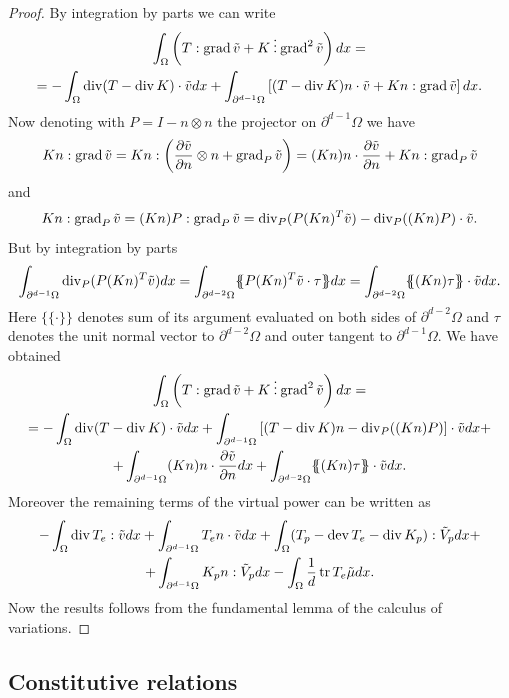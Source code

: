 \begin{proof}
By integration by parts we can write
\begin{multline*}
\int_\Omega\left(T:\operatorname{grad}\tilde v+K\mathbin{\vdots}\operatorname{grad}^2\tilde v\right)dx=\\
=-\int_\Omega\operatorname{div}(T-\operatorname{div} K)\cdot\tilde vdx+\int_{\partial^{d-1}\Omega}\left[(T-\operatorname{div} K)n\cdot\tilde v+Kn:\operatorname{grad}\tilde v\right]dx.
\end{multline*}
Now denoting with $P=I-n\otimes n$ the projector on $\partial^{d-1}\Omega$ we have
\[
Kn:\operatorname{grad}\tilde v=Kn:\left(\frac{\partial \tilde v}{\partial n}\otimes n+\operatorname{grad}_P\tilde v\right)=(Kn)n\cdot\frac{\partial \tilde v}{\partial n}+Kn:\operatorname{grad}_P\tilde v
\]
and
\[
Kn:\operatorname{grad}_P\tilde v=(Kn)P:\operatorname{grad}_P\tilde v=\operatorname{div}_P(P(Kn)^T\tilde v)-\operatorname{div}_P((Kn)P)\cdot\tilde v.
\]
But by integration by parts
\[
\int_{\partial^{d-1}\Omega}\diver_P(P(Kn)^T\tilde v)dx=\int_{\partial^{d-2}\Omega}\{\!\!\{P(Kn)^T\tilde v\cdot\tau\}\!\!\}dx=\int_{\partial^{d-2}\Omega}\{\!\!\{(Kn)\tau\}\!\!\}\cdot\tilde vdx.
\]
Here $\{\!\!\{\cdot\}\!\!\}$ denotes sum of its argument evaluated on both sides of $\partial^{d-2}\Omega$ and $\tau$ denotes the unit normal vector to $\partial^{d-2}\Omega$ and outer tangent to $\partial^{d-1}\Omega$. We have obtained
\begin{multline*}
\int_\Omega\left(T:\operatorname{grad}\tilde v+K\mathbin{\vdots}\operatorname{grad}^2\tilde v\right)dx=\\
=-\int_\Omega\operatorname{div}(T-\operatorname{div} K)\cdot\tilde vdx+\int_{\partial^{d-1}\Omega}\left[(T-\operatorname{div} K)n-\operatorname{div}_P((Kn)P)\right]\cdot\tilde vdx+\\
+\int_{\partial^{d-1}\Omega}(Kn)n\cdot\frac{\partial \tilde v}{\partial n}dx+\int_{\partial^{d-2}\Omega}\{\!\!\{(Kn)\tau\}\!\!\}\cdot\tilde vdx.
\end{multline*}
Moreover the remaining terms of the virtual power can be written as
\begin{multline*}
-\int_\Omega\operatorname{div} T_e:\tilde vdx+\int_{\partial^{d-1}\Omega}T_en\cdot\tilde vdx+\int_\Omega(T_p-\operatorname{dev} T_e-\operatorname{div} K_p):\tilde V_pdx+\\
+\int_{\partial^{d-1}\Omega}K_pn:\tilde V_pdx-\int_\Omega\frac{1}{d}\operatorname{tr} T_e\tilde\mu dx.
\end{multline*}
Now the results follows from the fundamental lemma of the calculus of variations.
\end{proof}

\subsection{Constitutive relations}
\label{subsec:constitutive}

